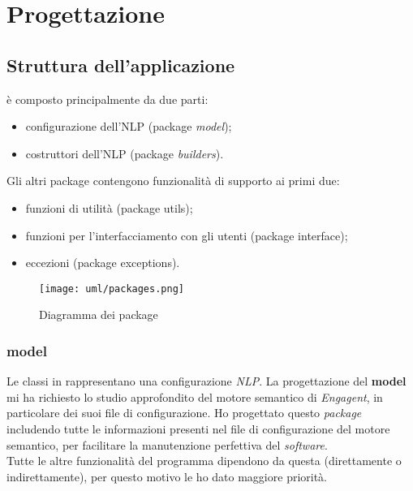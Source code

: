\section{Progettazione}
\label{sec:progettazione}
\subsection{Struttura dell'applicazione}
\app{} è composto principalmente da due parti:
\begin{itemize}
    \item configurazione dell'NLP (package \textit{model});
    \item costruttori dell'NLP (package \textit{builders}).
\end{itemize}
Gli altri package contengono funzionalità di supporto ai primi due:
\begin{itemize}
    \item funzioni di utilità (package utils);
    \item funzioni per l'interfacciamento con gli utenti (package interface);
    \item eccezioni (package exceptions).
\end{itemize}

\begin{figure}[H]
    \centering
    \texttt{[image: uml/packages.png]} 
    \caption{Diagramma dei package}
    \label{logo:company}
\end{figure}

\subsubsection{model}\label{sec:progettazione:model} %
Le classi in  rappresentano una configurazione \textit{NLP}.
La progettazione del \textbf{model} mi ha richiesto lo studio approfondito del motore semantico di \textit{Engagent}, in particolare dei suoi file di configurazione. Ho progettato questo \textit{package} includendo tutte le informazioni presenti nel file di configurazione del motore semantico, per facilitare la manutenzione perfettiva del \textit{software}.\\ Tutte le altre funzionalità del programma dipendono da questa (direttamente o indirettamente), per questo motivo le ho dato maggiore priorità. 

